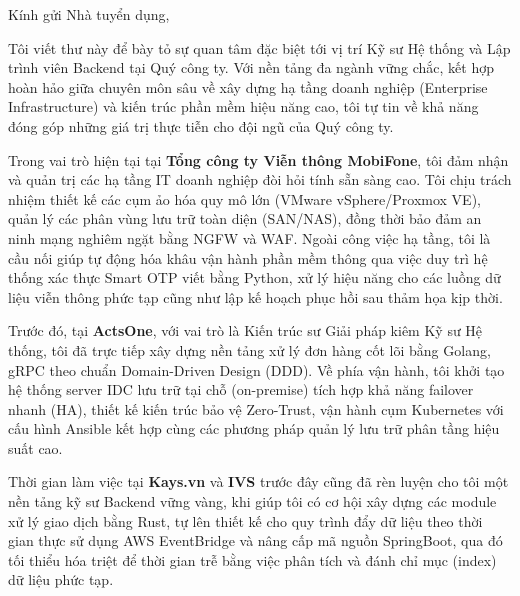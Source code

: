 \documentclass[10pt, letterpaper]{article}
\begin{document}
\pagestyle{empty}



\vspace{0.5cm}

\begin{onecolentry}

Kính gửi Nhà tuyển dụng,

\vspace{0.2cm}

Tôi viết thư này để bày tỏ sự quan tâm đặc biệt tới vị trí Kỹ sư Hệ thống và Lập trình viên Backend tại Quý công ty. Với nền tảng đa ngành vững chắc, kết hợp hoàn hảo giữa chuyên môn sâu về xây dựng hạ tầng doanh nghiệp (Enterprise Infrastructure) và kiến trúc phần mềm hiệu năng cao, tôi tự tin về khả năng đóng góp những giá trị thực tiễn cho đội ngũ của Quý công ty.

\vspace{0.2cm}

Trong vai trò hiện tại tại \textbf{Tổng công ty Viễn thông MobiFone}, tôi đảm nhận và quản trị các hạ tầng IT doanh nghiệp đòi hỏi tính sẵn sàng cao. Tôi chịu trách nhiệm thiết kế các cụm ảo hóa quy mô lớn (VMware vSphere/Proxmox VE), quản lý các phân vùng lưu trữ toàn diện (SAN/NAS), đồng thời bảo đảm an ninh mạng nghiêm ngặt bằng NGFW và WAF. Ngoài công việc hạ tầng, tôi là cầu nối giúp tự động hóa khâu vận hành phần mềm thông qua việc duy trì hệ thống xác thực Smart OTP viết bằng Python, xử lý hiệu năng cho các luồng dữ liệu viễn thông phức tạp cũng như lập kế hoạch phục hồi sau thảm họa kịp thời.

\vspace{0.2cm}

Trước đó, tại \textbf{ActsOne}, với vai trò là Kiến trúc sư Giải pháp kiêm Kỹ sư Hệ thống, tôi đã trực tiếp xây dựng nền tảng xử lý đơn hàng cốt lõi bằng Golang, gRPC theo chuẩn Domain-Driven Design (DDD). Về phía vận hành, tôi khởi tạo hệ thống server IDC lưu trữ tại chỗ (on-premise) tích hợp khả năng failover nhanh (HA), thiết kế kiến trúc bảo vệ Zero-Trust, vận hành cụm Kubernetes với cấu hình Ansible kết hợp cùng các phương pháp quản lý lưu trữ phân tầng hiệu suất cao.

\vspace{0.2cm}

Thời gian làm việc tại \textbf{Kays.vn} và \textbf{IVS} trước đây cũng đã rèn luyện cho tôi một nền tảng kỹ sư Backend vững vàng, khi giúp tôi có cơ hội xây dựng các module xử lý giao dịch bằng Rust, tự lên thiết kế cho quy trình đẩy dữ liệu theo thời gian thực sử dụng AWS EventBridge và nâng cấp mã nguồn SpringBoot, qua đó tối thiểu hóa triệt để thời gian trễ bằng việc phân tích và đánh chỉ mục (index) dữ liệu phức tạp.


\end{onecolentry}
\end{document}
